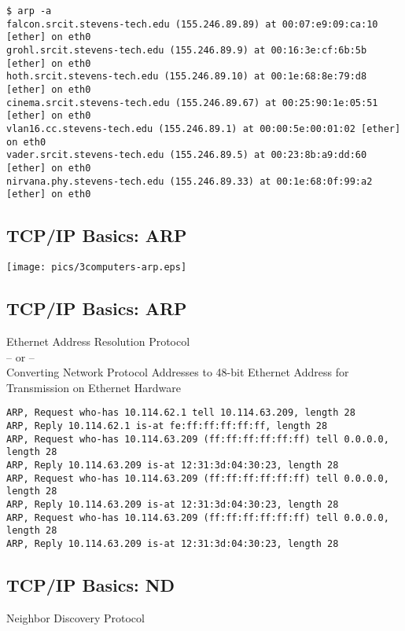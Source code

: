 \documentclass[xga]{xdvislides}
\begin{document}
\begin{verbatim}
$ arp -a
falcon.srcit.stevens-tech.edu (155.246.89.89) at 00:07:e9:09:ca:10 [ether] on eth0
grohl.srcit.stevens-tech.edu (155.246.89.9) at 00:16:3e:cf:6b:5b [ether] on eth0
hoth.srcit.stevens-tech.edu (155.246.89.10) at 00:1e:68:8e:79:d8 [ether] on eth0
cinema.srcit.stevens-tech.edu (155.246.89.67) at 00:25:90:1e:05:51 [ether] on eth0
vlan16.cc.stevens-tech.edu (155.246.89.1) at 00:00:5e:00:01:02 [ether] on eth0
vader.srcit.stevens-tech.edu (155.246.89.5) at 00:23:8b:a9:dd:60 [ether] on eth0
nirvana.phy.stevens-tech.edu (155.246.89.33) at 00:1e:68:0f:99:a2 [ether] on eth0
\end{verbatim}

\subsection{TCP/IP Basics: ARP}
\vspace*{\fill}
\begin{center}
	\texttt{[image: pics/3computers-arp.eps]}
\end{center}
\vspace*{\fill}


\subsection{TCP/IP Basics: ARP}
\begin{center}
Ethernet Address Resolution Protocol \\
-- or -- \\
Converting Network Protocol Addresses to 48-bit Ethernet Address for Transmission on Ethernet Hardware
\end{center}
\vspace{.2in}

\begin{verbatim}
ARP, Request who-has 10.114.62.1 tell 10.114.63.209, length 28
ARP, Reply 10.114.62.1 is-at fe:ff:ff:ff:ff:ff, length 28
ARP, Request who-has 10.114.63.209 (ff:ff:ff:ff:ff:ff) tell 0.0.0.0, length 28
ARP, Reply 10.114.63.209 is-at 12:31:3d:04:30:23, length 28
ARP, Request who-has 10.114.63.209 (ff:ff:ff:ff:ff:ff) tell 0.0.0.0, length 28
ARP, Reply 10.114.63.209 is-at 12:31:3d:04:30:23, length 28
ARP, Request who-has 10.114.63.209 (ff:ff:ff:ff:ff:ff) tell 0.0.0.0, length 28
ARP, Reply 10.114.63.209 is-at 12:31:3d:04:30:23, length 28
\end{verbatim}

\subsection{TCP/IP Basics: ND}
\begin{center}
Neighbor Discovery Protocol
\end{center}
\vspace{.2in}
\end{document}
